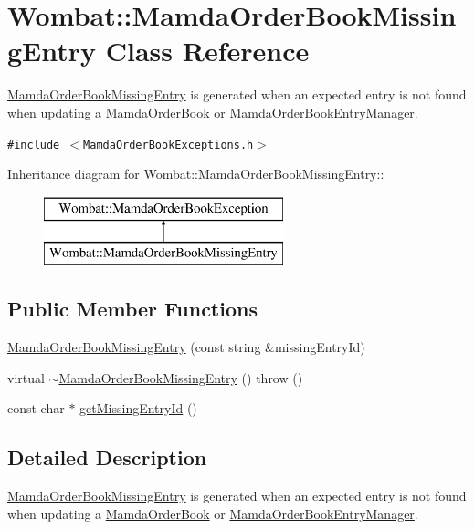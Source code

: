 \hypertarget{classWombat_1_1MamdaOrderBookMissingEntry}{
\section{Wombat::Mamda\-Order\-Book\-Missing\-Entry Class Reference}
\label{classWombat_1_1MamdaOrderBookMissingEntry}
}
\hyperlink{classWombat_1_1MamdaOrderBookMissingEntry}{Mamda\-Order\-Book\-Missing\-Entry} is generated when an expected entry is not found when updating a \hyperlink{classWombat_1_1MamdaOrderBook}{Mamda\-Order\-Book} or \hyperlink{classWombat_1_1MamdaOrderBookEntryManager}{Mamda\-Order\-Book\-Entry\-Manager}.  


{\tt \#include $<$Mamda\-Order\-Book\-Exceptions.h$>$}

Inheritance diagram for Wombat::Mamda\-Order\-Book\-Missing\-Entry::\begin{figure}[H]
\begin{center}
\leavevmode
\includegraphics[height=2cm]{classWombat_1_1MamdaOrderBookMissingEntry}
\end{center}
\end{figure}
\subsection*{Public Member Functions}
\begin{CompactItemize}
\item 
\hyperlink{classWombat_1_1MamdaOrderBookMissingEntry_c2c4a4d6481948c8a14507924d6b7d18}{Mamda\-Order\-Book\-Missing\-Entry} (const string \&missing\-Entry\-Id)
\item 
virtual \hyperlink{classWombat_1_1MamdaOrderBookMissingEntry_c2ef46559506ff9e0d0f9e4889bfdb66}{$\sim$Mamda\-Order\-Book\-Missing\-Entry} ()  throw ()
\item 
const char $\ast$ \hyperlink{classWombat_1_1MamdaOrderBookMissingEntry_d05930e2c879e7f5bf61cf76d2ec7ba3}{get\-Missing\-Entry\-Id} ()
\end{CompactItemize}


\subsection{Detailed Description}
\hyperlink{classWombat_1_1MamdaOrderBookMissingEntry}{Mamda\-Order\-Book\-Missing\-Entry} is generated when an expected entry is not found when updating a \hyperlink{classWombat_1_1MamdaOrderBook}{Mamda\-Order\-Book} or \hyperlink{classWombat_1_1MamdaOrderBookEntryManager}{Mamda\-Order\-Book\-Entry\-Manager}. 



